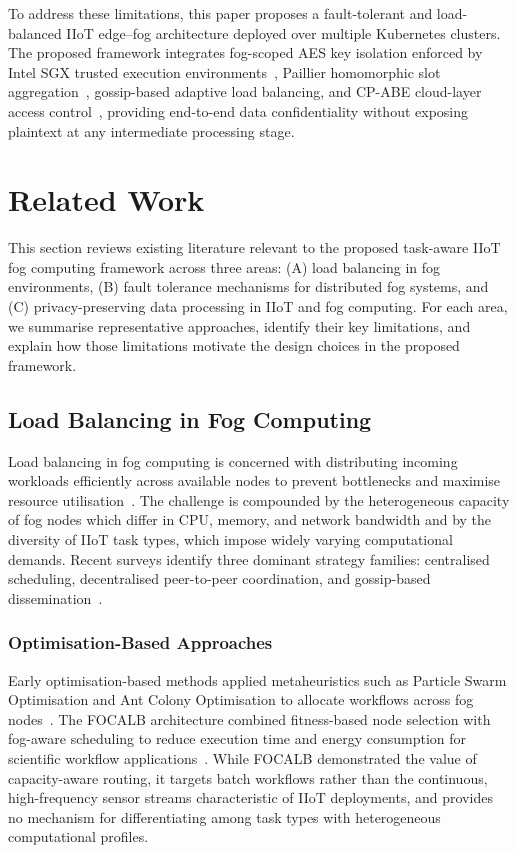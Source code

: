 \documentclass[conference]{IEEEtran}
\begin{document}
    To address these limitations, this paper proposes a fault-tolerant 
    and load-balanced IIoT edge--fog architecture deployed over multiple 
    Kubernetes clusters. The proposed framework integrates fog-scoped AES 
    key isolation enforced by Intel SGX trusted execution 
    environments~\cite{costan2016}, Paillier homomorphic slot 
    aggregation~\cite{paillier1999}, gossip-based adaptive load 
    balancing, and CP-ABE cloud-layer access control~\cite{penuelasmsa2024}, 
    providing end-to-end data confidentiality without exposing plaintext 
    at any intermediate processing stage.

       \section{Related Work}

This section reviews existing literature relevant to the proposed task-aware IIoT fog computing framework across three areas: (A) load balancing in fog environments, (B) fault tolerance mechanisms for distributed fog systems, and (C) privacy-preserving data processing in IIoT and fog computing. For each area, we summarise representative approaches, identify their key limitations, and explain how those limitations motivate the design choices in the proposed framework.

\subsection{Load Balancing in Fog Computing}

Load balancing in fog computing is concerned with distributing incoming workloads efficiently across available nodes to prevent bottlenecks and maximise resource utilisation~\cite{kashani2020}. The challenge is compounded by the heterogeneous capacity of fog nodes which differ in CPU, memory, and network bandwidth and by the diversity of IIoT task types, which impose widely varying computational demands. Recent surveys identify three dominant strategy families: centralised scheduling, decentralised peer-to-peer coordination, and gossip-based dissemination~\cite{vijarania2025,nemati2024}.

\subsubsection{Optimisation-Based Approaches}

Early optimisation-based methods applied metaheuristics such as Particle Swarm Optimisation and Ant Colony Optimisation to allocate workflows across fog nodes~\cite{tripathy2026}. The FOCALB architecture combined fitness-based node selection with fog-aware scheduling to reduce execution time and energy consumption for scientific workflow applications~\cite{kaur2021}. While FOCALB demonstrated the value of capacity-aware routing, it targets batch workflows rather than the continuous, high-frequency sensor streams characteristic of IIoT deployments, and provides no mechanism for differentiating among task types with heterogeneous computational profiles.
\end{document}
